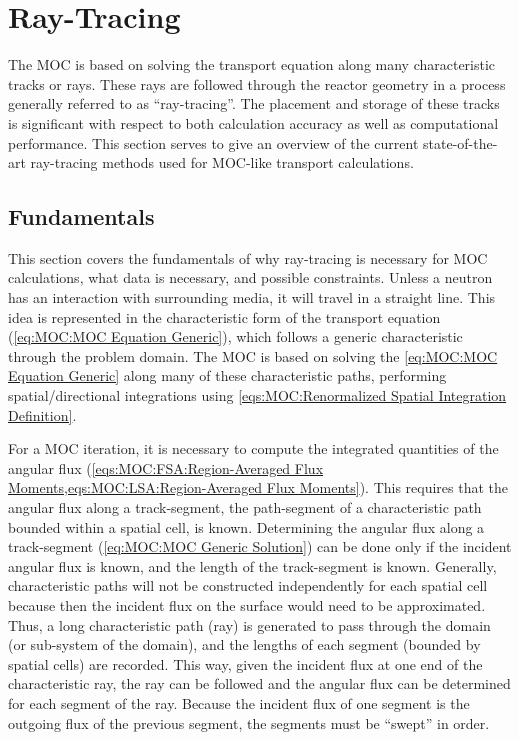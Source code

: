 {    \section{Ray-Tracing}{\label{sec:MOC:Ray-Tracing}
      The \acf{MOC} \cite{Askew1972} is based on solving the transport equation along many characteristic tracks or rays.
      These rays are followed through the reactor geometry in a process generally referred to as ``ray-tracing''.
      The placement and storage of these tracks is significant with respect to both calculation accuracy as well as computational performance.
      This section serves to give an overview of the current state-of-the-art ray-tracing methods used for \ac{MOC}-like transport calculations.

      \subsection{Fundamentals}{\label{ssec:MOC:RT:Fundamentals}
        This section covers the fundamentals of why ray-tracing is necessary for \ac{MOC} calculations, what data is necessary, and possible constraints.
        Unless a neutron has an interaction with surrounding media, it will travel in a straight line.
        This idea is represented in the characteristic form of the transport equation (\cref{eq:MOC:MOC Equation Generic}), which follows a generic characteristic through the problem domain.
        The \ac{MOC} is based on solving the \cref{eq:MOC:MOC Equation Generic} along many of these characteristic paths, performing spatial/directional integrations using \cref{eqs:MOC:Renormalized Spatial Integration Definition}.

        For a \ac{MOC} iteration, it is necessary to compute the integrated quantities of the angular flux (\cref{eqs:MOC:FSA:Region-Averaged Flux Moments,eqs:MOC:LSA:Region-Averaged Flux Moments}).
        This requires that the angular flux along a track-segment, the path-segment of a characteristic path bounded within a spatial cell, is known.
        Determining the angular flux along a track-segment (\cref{eq:MOC:MOC Generic Solution}) can be done only if the incident angular flux is known, and the length of the track-segment is known.
        Generally, characteristic paths will not be constructed independently for each spatial cell because then the incident flux on the surface would need to be approximated.
        Thus, a long characteristic path (ray) is generated to pass through the domain (or sub-system of the domain), and the lengths of each segment (bounded by spatial cells) are recorded.
        This way, given the incident flux at one end of the characteristic ray, the ray can be followed and the angular flux can be determined for each segment of the ray.
        Because the incident flux of one segment is the outgoing flux of the previous segment, the segments must be ``swept'' in order.
      }

}}
